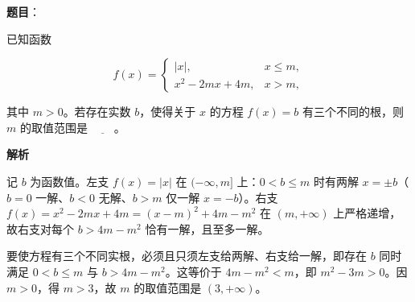 \begin{answer}

\textbf{题目}：

已知函数

\nopagebreak[4]
\[
f(x)=
\begin{cases}
|x|, & x\leqslant m,\\
x^2-2mx+4m, & x>m,
\end{cases}
\]

其中 \(m>0\)。若存在实数 \(b\)，使得关于 \(x\) 的方程 \(f(x)=b\) 有三个不同的根，则 \(m\) 的取值范围是 \(\underline{\qquad}\)。

\textbf{解析}

记 \(b\) 为函数值。左支 \(f(x)=|x|\) 在 \((-\infty,m]\) 上：\(0<b\leqslant m\) 时有两解 \(x=\pm b\)（\(b=0\) 一解、\(b<0\) 无解、\(b>m\) 仅一解 \(x=-b\)）。右支 \(f(x)=x^{2}-2mx+4m=(x-m)^{2}+4m-m^{2}\) 在 \((m,+\infty)\) 上严格递增，故右支对每个 \(b>4m-m^{2}\) 恰有一解，且至多一解。

要使方程有三个不同实根，必须且只须左支给两解、右支给一解，即存在 \(b\) 同时满足 \(0<b\leqslant m\) 与 \(b>4m-m^{2}\)。这等价于 \(4m-m^{2}<m\)，即 \(m^{2}-3m>0\)。因 \(m>0\)，得 \(m>3\)，故 \(m\) 的取值范围是 \((3,+\infty)\)。


\end{answer}
